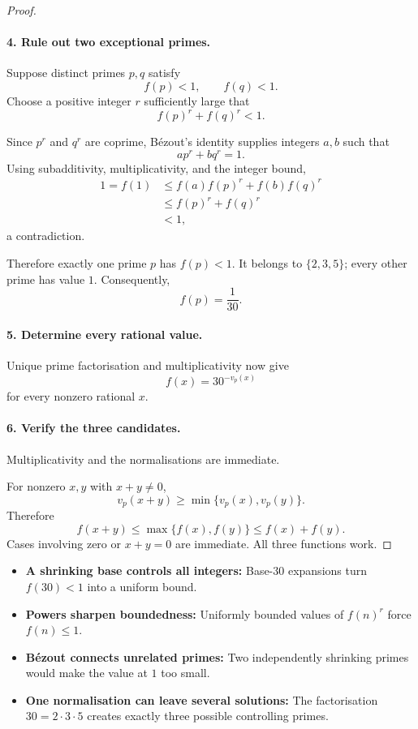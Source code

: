 \begin{dlsummary}[title={\bfseries Solution 65. Three Hidden Primes},breakable]
\begin{proof}
\paragraph{4. Rule out two exceptional primes.}

Suppose distinct primes \(p,q\) satisfy
\[
f(p)<1,\qquad f(q)<1.
\]
Choose a positive integer \(r\) sufficiently large that
\[
f(p)^r+f(q)^r<1.
\]

Since \(p^r\) and \(q^r\) are coprime, Bézout’s identity supplies integers \(a,b\) such that
\[
ap^r+bq^r=1.
\]
Using subadditivity, multiplicativity, and the integer bound,
\[
\begin{aligned}
1=f(1)
&\le f(a)f(p)^r+f(b)f(q)^r\\
&\le f(p)^r+f(q)^r\\
&<1,
\end{aligned}
\]
a contradiction.

Therefore exactly one prime \(p\) has \(f(p)<1\). It belongs to \(\{2,3,5\}\); every other prime has value \(1\). Consequently,
\[
f(p)=\frac1{30}.
\]

\paragraph{5. Determine every rational value.}

Unique prime factorisation and multiplicativity now give
\[
f(x)=30^{-v_p(x)}
\]
for every nonzero rational \(x\).

\paragraph{6. Verify the three candidates.}

Multiplicativity and the normalisations are immediate.

For nonzero \(x,y\) with \(x+y\ne0\),
\[
v_p(x+y)\ge\min\{v_p(x),v_p(y)\}.
\]
Therefore
\[
f(x+y)
\le\max\{f(x),f(y)\}
\le f(x)+f(y).
\]
Cases involving zero or \(x+y=0\) are immediate. All three functions work.
\end{proof}
\end{dlsummary}

\begin{takeaways}
\begin{itemize}
\item \textbf{A shrinking base controls all integers:} Base-\(30\) expansions turn \(f(30)<1\) into a uniform bound.
\item \textbf{Powers sharpen boundedness:} Uniformly bounded values of \(f(n)^r\) force \(f(n)\le1\).
\item \textbf{Bézout connects unrelated primes:} Two independently shrinking primes would make the value at \(1\) too small.
\item \textbf{One normalisation can leave several solutions:} The factorisation \(30=2\cdot3\cdot5\) creates exactly three possible controlling primes.
\end{itemize}
\end{takeaways}
